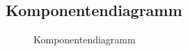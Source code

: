 \subsection{Komponentendiagramm}
\label{app:Komponentendiagramm}
\begin{figure}[htb]
\centering
{}
\caption{Komponentendiagramm}
\label{fig:komp_dia}
\end{figure}